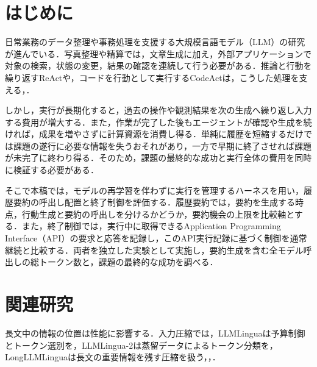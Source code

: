 \documentclass[letter]{ieicej}
\begin{document}
\maketitle


\setlength{\intextsep}{\baselineskip}
\setlength{\textfloatsep}{\baselineskip}
\setlength{\dbltextfloatsep}{\baselineskip}

\section{はじめに}

日常業務のデータ整理や事務処理を支援する大規模言語モデル（LLM）の研究が進んでいる．写真整理や精算では，文章生成に加え，外部アプリケーションで対象の検索，状態の変更，結果の確認を連続して行う必要がある．推論と行動を繰り返すReActや，コードを行動として実行するCodeActは，こうした処理を支える\cite{yao2023react}，\cite{wang2024codeact}．

しかし，実行が長期化すると，過去の操作や観測結果を次の生成へ繰り返し入力する費用が増大する．また，作業が完了した後もエージェントが確認や生成を続ければ，成果を増やさずに計算資源を消費し得る．単純に履歴を短縮するだけでは課題の遂行に必要な情報を失うおそれがあり，一方で早期に終了させれば課題が未完了に終わり得る．そのため，課題の最終的な成功と実行全体の費用を同時に検証する必要がある．

そこで本稿では，モデルの再学習を伴わずに実行を管理するハーネスを用い，履歴要約の呼出し配置と終了制御を評価する．履歴要約では，要約を生成する時点，行動生成と要約の呼出しを分けるかどうか，要約機会の上限を比較軸とする．また，終了制御では，実行中に取得できるApplication Programming Interface（API）の要求と応答を記録し，このAPI実行記録に基づく制御を通常継続と比較する．両者を独立した実験として実施し，要約生成を含む全モデル呼出しの総トークン数と，課題の最終的な成功を調べる．

\par\noindent\begin{minipage}{\columnwidth}
\section{関連研究}

長文中の情報の位置は性能に影響する\cite{liu2024lost}．入力圧縮では，LLMLinguaは予算制御とトークン選別を，LLMLingua-2は蒸留データによるトークン分類を，LongLLMLinguaは長文の重要情報を残す圧縮を扱う\cite{jiang2023llmlingua}，\cite{pan2024llmlingua2}，\cite{jiang2024longllmlingua}．

\end{minipage}\par{}
\end{document}
